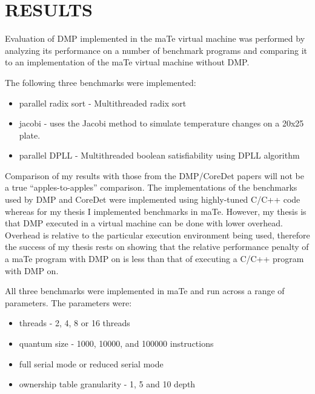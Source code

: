 \chapter{RESULTS}
\label{RESULTS}

Evaluation of DMP implemented in the maTe virtual machine was
performed by analyzing its performance on a number of benchmark
programs and comparing it to an implementation of the maTe virtual
machine without DMP.

The following three benchmarks were implemented:

\begin{itemize}
\item parallel radix sort - Multithreaded radix sort

\item jacobi - uses the Jacobi method to simulate temperature changes
  on a 20x25 plate.

\item parallel DPLL - Multithreaded boolean satisfiability using DPLL
  algorithm
\end{itemize}

Comparison of my results with those from the DMP/CoreDet papers will
not be a true ``apples-to-apples'' comparison.  The implementations of
the benchmarks used by DMP \cite{dmp} and CoreDet \cite{coredet} were
implemented using highly-tuned C/C++ code whereas for my thesis I
implemented benchmarks in maTe.  However, my thesis is that DMP
executed in a virtual machine can be done with lower overhead.
Overhead is relative to the particular execution environment being
used, therefore the success of my thesis rests on showing that the
relative performance penalty of a maTe program with DMP on is less
than that of executing a C/C++ program with DMP on.

All three benchmarks were implemented in maTe and run across a range
of parameters.  The parameters were:

\begin{itemize}
\item threads - 2, 4, 8 or 16 threads

\item quantum size - 1000, 10000, and 100000 instructions

\item full serial mode or reduced serial mode

\item ownership table granularity - 1, 5 and 10 depth
\end{itemize}

